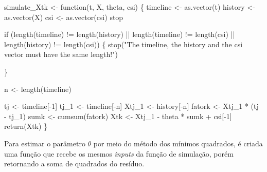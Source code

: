 \documentclass[
  letterpaper,
  DIV=11,
  numbers=noendperiod]{scrreprt}
\newenvironment{Shaded}{\begin{snugshade}}{\end{snugshade}}
\newcommand{\ControlFlowTok}[1]{\textcolor[rgb]{0.00,0.23,0.31}{#1}}
\newcommand{\DecValTok}[1]{\textcolor[rgb]{0.68,0.00,0.00}{#1}}
\newcommand{\FunctionTok}[1]{\textcolor[rgb]{0.28,0.35,0.67}{#1}}
\newcommand{\NormalTok}[1]{\textcolor[rgb]{0.00,0.23,0.31}{#1}}
\newcommand{\OtherTok}[1]{\textcolor[rgb]{0.00,0.23,0.31}{#1}}
\newcommand{\SpecialCharTok}[1]{\textcolor[rgb]{0.37,0.37,0.37}{#1}}
\newcommand{\StringTok}[1]{\textcolor[rgb]{0.13,0.47,0.30}{#1}}
\begin{document}
\begin{Shaded}
\begin{Highlighting}[]
\NormalTok{simulate\_Xtk }\OtherTok{\textless{}{-}} \ControlFlowTok{function}\NormalTok{(t, X, theta, csi) \{}
\NormalTok{    timeline }\OtherTok{\textless{}{-}} \FunctionTok{as.vector}\NormalTok{(t)}
\NormalTok{    history }\OtherTok{\textless{}{-}} \FunctionTok{as.vector}\NormalTok{(X)}
\NormalTok{    csi }\OtherTok{\textless{}{-}} \FunctionTok{as.vector}\NormalTok{(csi)}
\NormalTok{stop}

    \ControlFlowTok{if}\NormalTok{ (}\FunctionTok{length}\NormalTok{(timeline) }\SpecialCharTok{!=} \FunctionTok{length}\NormalTok{(history) }\SpecialCharTok{||}
        \FunctionTok{length}\NormalTok{(timeline) }\SpecialCharTok{!=} \FunctionTok{length}\NormalTok{(csi) }\SpecialCharTok{||}
        \FunctionTok{length}\NormalTok{(history) }\SpecialCharTok{!=} \FunctionTok{length}\NormalTok{(csi)) \{}
        \FunctionTok{stop}\NormalTok{(}\StringTok{"The timeline, the history and the csi vector must have the same length!"}\NormalTok{)}
        
\NormalTok{    \}}

\NormalTok{    n }\OtherTok{\textless{}{-}} \FunctionTok{length}\NormalTok{(timeline)}

\NormalTok{    tj }\OtherTok{\textless{}{-}}\NormalTok{ timeline[}\SpecialCharTok{{-}}\DecValTok{1}\NormalTok{]}
\NormalTok{    tj\_1 }\OtherTok{\textless{}{-}}\NormalTok{ timeline[}\SpecialCharTok{{-}}\NormalTok{n]}
\NormalTok{    Xtj\_1 }\OtherTok{\textless{}{-}}\NormalTok{ history[}\SpecialCharTok{{-}}\NormalTok{n]}
\NormalTok{    fatork }\OtherTok{\textless{}{-}}\NormalTok{ Xtj\_1 }\SpecialCharTok{*}\NormalTok{ (tj }\SpecialCharTok{{-}}\NormalTok{ tj\_1)}
\NormalTok{    sumk }\OtherTok{\textless{}{-}} \FunctionTok{cumsum}\NormalTok{(fatork)}
\NormalTok{    Xtk }\OtherTok{\textless{}{-}}\NormalTok{ Xtj\_1 }\SpecialCharTok{{-}}\NormalTok{ theta }\SpecialCharTok{*}\NormalTok{ sumk }\SpecialCharTok{+}\NormalTok{ csi[}\SpecialCharTok{{-}}\DecValTok{1}\NormalTok{]}
    \FunctionTok{return}\NormalTok{(Xtk)}
\NormalTok{\}}
\end{Highlighting}
\end{Shaded}

Para estimar o parâmetro \(\theta\) por meio do método dos mínimos
quadrados, é criada uma função que recebe os mesmos \emph{inputs} da
função de simulação, porém retornando a soma de quadrados do resíduo.
\end{document}
